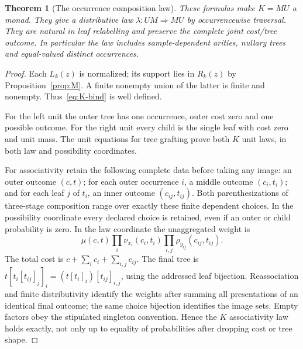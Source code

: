 \documentclass[11pt,a4paper]{article}
\newtheorem{theorem}{Theorem}[section]
\theoremstyle{definition}
\begin{document}
\begin{theorem}[The occurrence composition law]\label{thm:K}
These formulas make $K=M U$ a monad. They give a distributive law
$\lambda:UM\Rightarrow MU$ by occurrencewise traversal. They are
natural in leaf relabelling and preserve the complete joint cost/tree
outcome. In particular the law includes sample-dependent arities,
nullary trees and equal-valued distinct occurrences.
\end{theorem}
\begin{proof}
Each $L_k(z)$ is normalized; its support lies in $R_k(z)$ by
Proposition~\ref{prop:M}. A finite nonempty union of the latter is
finite and nonempty. Thus~\eqref{eq:K-bind} is well defined.

For the left unit the outer tree has one occurrence, outer cost zero and
one possible outcome. For the right unit every child is the single leaf
with cost zero and unit mass. The unit equations for tree grafting prove
both $K$ unit laws, in both law and possibility coordinates.

For associativity retain the following complete data before taking any
image: an outer outcome $(c,t)$; for each outer occurrence $i$, a middle
outcome $(c_i,t_i)$; and for each leaf $j$ of $t_i$, an inner outcome
$(c_{ij},t_{ij})$. Both parenthesizations of three-stage composition
range over exactly these finite dependent choices. In the possibility
coordinate every declared choice is retained, even if an outer or child
probability is zero. In the law coordinate the unaggregated weight is
\[
 \mu(c,t)\prod_i\nu_{x_i}(c_i,t_i)
                  \prod_{i,j}\rho_{y_{ij}}(c_{ij},t_{ij}).
\]
The total cost is $c+\sum_i c_i+\sum_{i,j}c_{ij}$. The final tree is
$t[t_i[t_{ij}]_j]_i=(t[t_i]_i)[t_{ij}]_{i,j}$, using the addressed
leaf bijection. Reassociation and finite distributivity identify the
weights after summing all presentations of an identical final outcome;
the same choice bijection identifies the image sets. Empty factors obey
the stipulated singleton convention. Hence the $K$ associativity law
holds exactly, not only up to equality of probabilities after dropping
cost or tree shape.


\end{proof}
\end{document}
